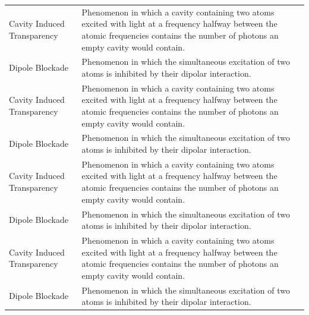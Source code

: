 \begin{xltabular}{\textwidth}{@{}l X@{}}
    Cavity Induced Transparency & Phenomenon in which a cavity containing two atoms excited with light at a frequency halfway between the atomic frequencies contains the number of photons an empty cavity would contain. \\
    Dipole Blockade             & Phenomenon in which the simultaneous excitation of two atoms is inhibited by their dipolar interaction.                                                                                  \\
    Cavity Induced Transparency & Phenomenon in which a cavity containing two atoms excited with light at a frequency halfway between the atomic frequencies contains the number of photons an empty cavity would contain. \\
    Dipole Blockade             & Phenomenon in which the simultaneous excitation of two atoms is inhibited by their dipolar interaction.                                                                                  \\
    Cavity Induced Transparency & Phenomenon in which a cavity containing two atoms excited with light at a frequency halfway between the atomic frequencies contains the number of photons an empty cavity would contain. \\
    Dipole Blockade             & Phenomenon in which the simultaneous excitation of two atoms is inhibited by their dipolar interaction.                                                                                  \\
    Cavity Induced Transparency & Phenomenon in which a cavity containing two atoms excited with light at a frequency halfway between the atomic frequencies contains the number of photons an empty cavity would contain. \\
    Dipole Blockade             & Phenomenon in which the simultaneous excitation of two atoms is inhibited by their dipolar interaction.
\end{xltabular}

